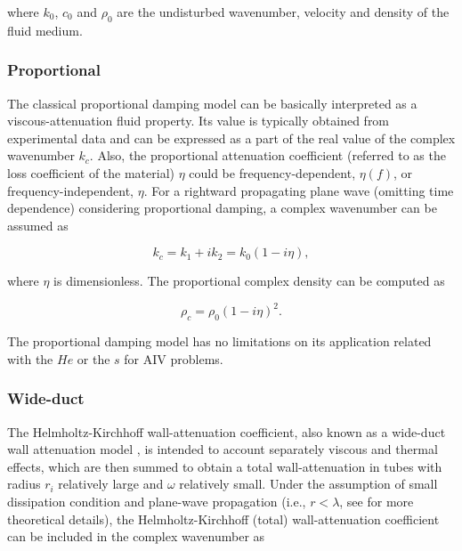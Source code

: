 \documentclass[12pt]{article}
\begin{document}
\noindent where $k_0$, $c_0$ and $\rho_0$ are the undisturbed wavenumber, velocity and density of the fluid medium.

\subsubsection{Proportional} \label{subsubsec:proportional}

The classical proportional damping model can be basically interpreted as a viscous-attenuation fluid property. Its value is typically obtained from experimental data and can be expressed as a part of the real value of the complex wavenumber $k_c$. Also, the proportional attenuation coefficient (referred to as the loss coefficient of the material) $\eta$ could be frequency-dependent, $\eta(f)$, or frequency-independent, $\eta$. For a rightward propagating plane wave (omitting time dependence) considering proportional damping, a complex wavenumber can be assumed as

\begin{equation} \label{eq:complex_wavenumber_hysteretic} 
	k_c = k_1 + i k_2 = k_0(1 -i\eta),
\end{equation}

\noindent where $\eta$ is dimensionless. The proportional complex density can be computed as

\begin{equation} \label{eq:complex_density}
	\rho_{c} = \rho_{0} (1-i \eta)^2.
\end{equation}

\noindent The proportional damping model has no limitations on its application related with the $He$ or the $s$ for \acrshort{AIV} problems.

\subsubsection{Wide-duct} \label{subsubsec:wide-duct}

The Helmholtz-Kirchhoff wall-attenuation coefficient, also known as a wide-duct wall attenuation model \cite{temkin1981elements}, is intended to account separately viscous and thermal effects, which are then summed to obtain a total wall-attenuation in tubes with radius $r_i$ relatively large and $\omega$ relatively small. Under the assumption of small dissipation condition and plane-wave propagation (i.e.,  $r < \lambda$, see \cite{temkin1981elements} for more theoretical details), the Helmholtz-Kirchhoff (total) wall-attenuation coefficient can be included in the complex wavenumber as
\end{document}
